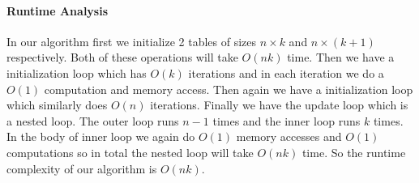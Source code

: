 \documentclass[answers]{exam}
\begin{document}
\begin{questions}
\begin{solution}
\paragraph{Runtime Analysis}
In our algorithm first we initialize 2 tables of sizes $n \times k$ and $n \times (k+1)$ respectively. Both of these operations will take $O(nk)$ time. Then we have a initialization loop which has $O(k)$ iterations and in each iteration we do a $O(1)$ computation and memory access. Then again we have a initialization loop which similarly does $O(n)$ iterations. Finally we have the update loop which is a nested loop. The outer loop runs $n-1$ times and the inner loop runs $k$ times. In the body of inner loop we again do $O(1)$ memory accesses and $O(1)$ computations so in total the nested loop will take $O(nk)$ time. So the runtime complexity of our algorithm is $O(nk)$.

\end{solution}
\end{questions}
\end{document}

